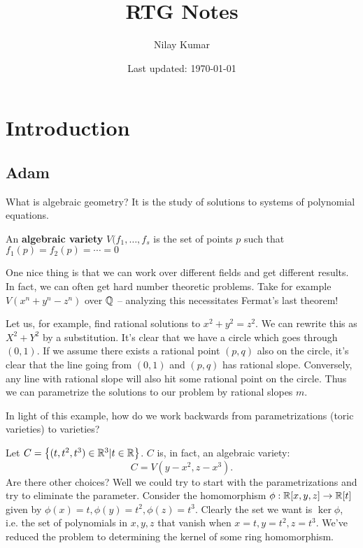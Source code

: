 \documentclass{../mathnotes}
\title{RTG Notes}
\author{Nilay Kumar}
\date{Last updated: \today}
\begin{document}
\maketitle

\setcounter{section}{-1}

\section{Introduction}

\subsection{Adam}

What is algebraic geometry? It is the study of solutions to systems of polynomial equations.

\begin{defn}
    An \textbf{algebraic variety} $V(f_1,\ldots,f_s$ is the set of points $p$ such that $f_1(p)=f_2(p)=\cdots=0$
\end{defn}

One nice thing is that we can work over different fields and get different results. In fact, we can often get
hard number theoretic problems. Take for example $V(x^n+y^n-z^n)$ over $\mathbb{Q}$ -- analyzing this necessitates Fermat's
last theorem!

\begin{exmp}
    Let us, for example, find rational solutions to $x^2+y^2=z^2$. We can rewrite this as $X^2+Y^2$ by a
    substitution. It's clear that we have a circle which goes through $(0,1)$. If we assume there exists a
    rational point $(p,q)$ also on the circle, it's clear that the line going from $(0,1)$ and $(p,q)$ has rational
    slope. Conversely, any line with rational slope will also hit some rational point on the circle. Thus we can
    parametrize the solutions to our problem by rational slopes $m$.
\end{exmp}

In light of this example, how do we work backwards from parametrizations (toric varieties) to varieties?

\begin{exmp}
    Let $C=\left\{ (t,t^2,t^3)\in\mathbb{R}^3|t\in\mathbb{R} \right\}$. $C$ is, in fact, an algebraic variety:
    \[C=V(y-x^2,z-x^3).\]
    Are there other choices? Well we could try to start with the parametrizations and try to eliminate the parameter.
    Consider the homomorphism $\phi:\mathbb{R}[x,y,z]\to\mathbb{R}[t]$ given by $\phi(x)=t,\phi(y)=t^2,\phi(z)=t^3$. Clearly the set
    we want is $\ker\phi$, i.e. the set of polynomials in $x,y,z$ that vanish when $x=t,y=t^2,z=t^3$. We've reduced 
    the problem to determining the kernel of some ring homomorphism.
\end{exmp}
\end{document}
